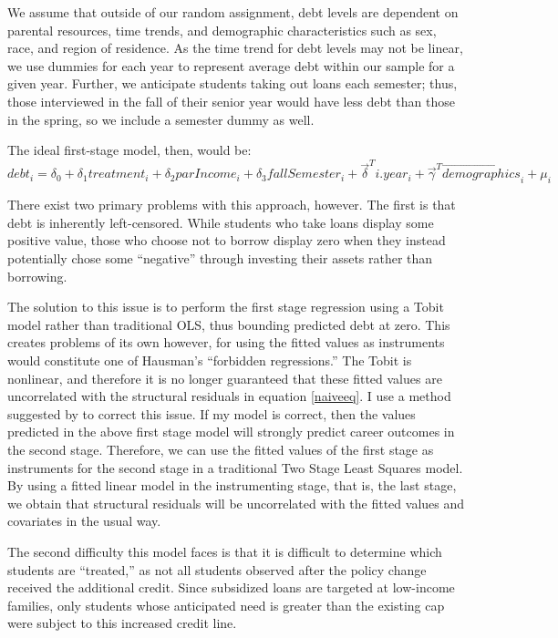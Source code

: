 \documentclass[12pt]{article}
\begin{document}
	We assume that outside of our random assignment, debt levels are dependent on parental resources, time trends, and demographic characteristics such as sex, race, and region of residence. As the time trend for debt levels may not be linear, we use dummies for each year to represent average debt within our sample for a given year. Further, we anticipate students taking out loans each semester; thus, those interviewed in the fall of their senior year would have less debt than those in the spring, so we include a semester dummy as well.
	
	The ideal first-stage model, then, would be: 
	\begin{equation}
	debt_i = \delta_0 + \delta_1 treatment_i + \delta_2 parIncome_i + \delta_3 fallSemester_i + \vec{\delta}^T i.year_i + \vec{\gamma}^T \vec{demographics}_i + \mu_i \label{fseq}
	\end{equation}
	
	There exist two primary problems with this approach, however. The first is that debt is inherently left-censored. While students who take loans display some positive value, those who choose not to borrow display zero when they instead potentially chose some ``negative'' through investing their assets rather than borrowing. 
	
	The solution to this issue is to perform the first stage regression using a Tobit model rather than traditional OLS, thus bounding predicted debt at zero. This creates problems of its own however, for using the fitted values as instruments would constitute one of Hausman's ``forbidden regressions.'' The Tobit is nonlinear, and therefore it is no longer guaranteed that these fitted values are uncorrelated with the structural residuals in equation \ref{naiveeq}. I use a method suggested by \textcite{angrist2009} to correct this issue. If my model is correct, then the values predicted in the above first stage model will strongly predict career outcomes in the second stage. Therefore, we can use the fitted values of the first stage as instruments for the second stage in a traditional Two Stage Least Squares model. By using a fitted linear model in the instrumenting stage, that is, the last stage, we obtain that structural residuals will be uncorrelated with the fitted values and covariates in the usual way. 
	
	The second difficulty this model faces is that it is difficult to determine which students are ``treated,'' as not all students observed after the policy change received the additional credit. Since subsidized loans are targeted at low-income families, only students whose anticipated need is greater than the existing cap were subject to this increased credit line. 
	
\end{document}
